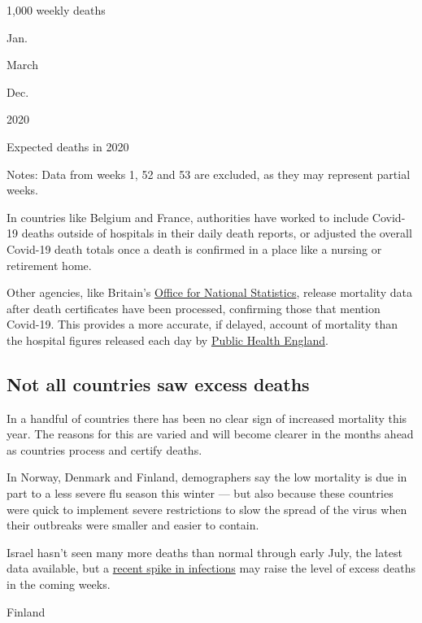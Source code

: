 1,000 weekly deaths

Jan.

March

Dec.

2020

Expected deaths in 2020

Notes: Data from weeks 1, 52 and 53 are excluded, as they may represent
partial weeks.

In countries like Belgium and France, authorities have worked to include
Covid-19 deaths outside of hospitals in their daily death reports, or
adjusted the overall Covid-19 death totals once a death is confirmed in
a place like a nursing or retirement home.

Other agencies, like Britain's
\href{https://www.ons.gov.uk/peoplepopulationandcommunity/birthsdeathsandmarriages/deaths/bulletins/deathsregisteredweeklyinenglandandwalesprovisional/weekending20march2020}{Office
for National Statistics}, release mortality data after death
certificates have been processed, confirming those that mention
Covid-19. This provides a more accurate, if delayed, account of
mortality than the hospital figures released each day by
\href{https://coronavirus.data.gov.uk/}{Public Health England}.

\hypertarget{not-all-countries-saw-excess-deaths}{%
\subsection{Not all countries saw excess
deaths}\label{not-all-countries-saw-excess-deaths}}

In a handful of countries there has been no clear sign of increased
mortality this year. The reasons for this are varied and will become
clearer in the months ahead as countries process and certify deaths.

In Norway, Denmark and Finland, demographers say the low mortality is
due in part to a less severe flu season this winter --- but also because
these countries were quick to implement severe restrictions to slow the
spread of the virus when their outbreaks were smaller and easier to
contain.

Israel hasn't seen many more deaths than normal through early July, the
latest data available, but a
\href{https://www.nytimes3xbfgragh.onion/2020/07/24/world/middleeast/israel-virus-protests-netanyahu.html}{recent
spike in infections} may raise the level of excess deaths in the coming
weeks.

Finland

